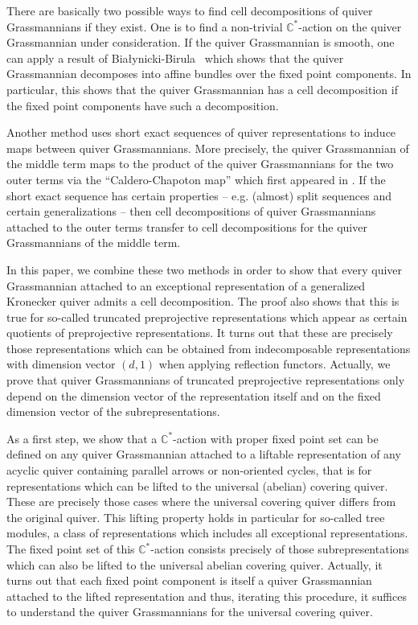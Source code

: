 \documentclass[smallextended,envcountsect,envcountsame]{svjour3}
\numberwithin{equation}{section}
\newcommand{\CC}{\mathbb{C}}
\begin{document}
There are basically two possible ways to find cell decompositions of quiver Grassmannians if they exist.
One is to find a non-trivial $\CC^*$-action on the quiver Grassmannian under consideration.
If the quiver Grassmannian is smooth, one can apply a result of Bia\l{}ynicki-Birula~\cite{bb} which shows that the quiver Grassmannian decomposes into affine bundles over the fixed point components.
In particular, this shows that the quiver Grassmannian has a cell decomposition if the fixed point components have such a decomposition.

Another method uses short exact sequences of quiver representations to induce maps between quiver Grassmannians.
More precisely, the quiver Grassmannian of the middle term maps to the product of the quiver Grassmannians for the two outer terms via the ``Caldero-Chapoton map'' which first appeared in \cite{cc}. 
If the short exact sequence has certain properties -- e.g. (almost) split sequences and certain generalizations -- then cell decompositions of quiver Grassmannians attached to the outer terms transfer to cell decompositions for the quiver Grassmannians of the middle term.

In this paper, we combine these two methods in order to show that every quiver Grassmannian attached to an exceptional representation of a generalized Kronecker quiver admits a cell decomposition.
The proof also shows that this is true for so-called truncated preprojective representations which appear as certain quotients of preprojective representations.
It turns out that these are precisely those representations which can be obtained from indecomposable representations with dimension vector $(d,1)$ when applying reflection functors.
Actually, we prove that quiver Grassmannians of truncated preprojective representations only depend on the dimension vector of the representation itself and on the fixed dimension vector of the subrepresentations.

As a first step, we show that a $\CC^*$-action with proper fixed point set can be defined on any quiver Grassmannian attached to a liftable representation of any acyclic quiver containing parallel arrows or non-oriented cycles, that is for representations which can be lifted to the universal (abelian) covering quiver.
These are precisely those cases where the universal covering quiver differs from the original quiver.
This lifting property holds in particular for so-called tree modules, a class of representations which includes all exceptional representations.
The fixed point set of this $\CC^*$-action consists precisely of those subrepresentations which can also be lifted to the universal abelian covering quiver.
Actually, it turns out that each fixed point component is itself a quiver Grassmannian attached to the lifted representation and thus, iterating this procedure, it suffices to understand the quiver Grassmannians for the universal covering quiver.
\end{document}
